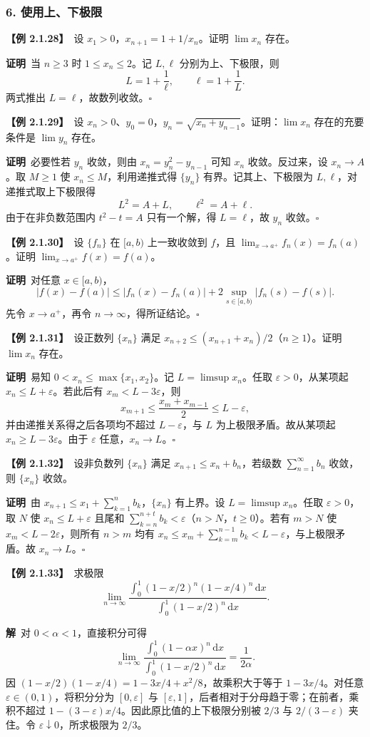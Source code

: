 \documentclass[UTF8,a4paper,11pt]{ctexart}
\newcommand{\ex}[1]{\par\medskip\noindent\textbf{【例 #1】}\ }
\newcommand{\pf}{\par\noindent\textbf{证明}\ }
\newcommand{\sol}{\par\noindent\textbf{解}\ }
\begin{document}
\subsubsection*{6. 使用上、下极限}
\ex{2.1.28}设 $x_1>0$，$x_{n+1}=1+1/x_n$。证明 $\lim x_n$ 存在。
\pf 当 $n\ge3$ 时 $1\le x_n\le2$。记 $L,\ell$ 分别为上、下极限，则
\[
L=1+\frac1\ell,\qquad \ell=1+\frac1L.
\]
两式推出 $L=\ell$，故数列收敛。\hfill$\square$

\ex{2.1.29}设 $x_n>0$、$y_0=0$，$y_n=\sqrt{x_n+y_{n-1}}$。证明：$\lim x_n$ 存在的充要条件是 $\lim y_n$ 存在。
\pf 必要性若 $y_n$ 收敛，则由 $x_n=y_n^2-y_{n-1}$ 可知 $x_n$ 收敛。反过来，设 $x_n\to A$。取 $M\ge1$ 使 $x_n\le M$，利用递推式得 $\{y_n\}$ 有界。记其上、下极限为 $L,\ell$，对递推式取上下极限得
\[
L^2=A+L,\qquad \ell^2=A+\ell.
\]
由于在非负数范围内 $t^2-t=A$ 只有一个解，得 $L=\ell$，故 $y_n$ 收敛。\hfill$\square$

\ex{2.1.30}设 $\{f_n\}$ 在 $[a,b)$ 上一致收敛到 $f$，且 $\lim_{x\to a^+}f_n(x)=f_n(a)$。证明 $\lim_{x\to a^+}f(x)=f(a)$。
\pf 对任意 $x\in[a,b)$，
\[
|f(x)-f(a)|\le |f_n(x)-f_n(a)|+2\sup_{s\in[a,b)}|f_n(s)-f(s)|.
\]
先令 $x\to a^+$，再令 $n\to\infty$，得所证结论。\hfill$\square$

\ex{2.1.31}设正数列 $\{x_n\}$ 满足 $x_{n+2}\le(x_{n+1}+x_n)/2$（$n\ge1$）。证明 $\lim x_n$ 存在。
\pf 易知 $0<x_n\le\max\{x_1,x_2\}$。记 $L=\limsup x_n$。任取 $\varepsilon>0$，从某项起 $x_n\le L+\varepsilon$。若此后有 $x_m<L-3\varepsilon$，则
\[
x_{m+1}\le\frac{x_m+x_{m-1}}2\le L-\varepsilon,
\]
并由递推关系得之后各项均不超过 $L-\varepsilon$，与 $L$ 为上极限矛盾。故从某项起 $x_n\ge L-3\varepsilon$。由于 $\varepsilon$ 任意，$x_n\to L$。\hfill$\square$

\ex{2.1.32}设非负数列 $\{x_n\}$ 满足 $x_{n+1}\le x_n+b_n$，若级数 $\sum_{n=1}^{\infty}b_n$ 收敛，则 $\{x_n\}$ 收敛。
\pf 由 $x_{n+1}\le x_1+\sum_{k=1}^{n}b_k$，$\{x_n\}$ 有上界。设 $L=\limsup x_n$。任取 $\varepsilon>0$，取 $N$ 使 $x_n\le L+\varepsilon$ 且尾和 $\sum_{k=n}^{n+t}b_k<\varepsilon$（$n>N$，$t\ge0$）。若有 $m>N$ 使 $x_m<L-2\varepsilon$，则所有 $n>m$ 均有 $x_n\le x_m+\sum_{k=m}^{n-1}b_k<L-\varepsilon$，与上极限矛盾。故 $x_n\to L$。\hfill$\square$

\ex{2.1.33}求极限
\[
\lim_{n\to\infty}
\frac{\int_0^1(1-x/2)^n(1-x/4)^n\,\mathrm dx}
{\int_0^1(1-x/2)^n\,\mathrm dx}.
\]
\sol 对 $0<\alpha<1$，直接积分可得
\[
\lim_{n\to\infty}
\frac{\int_0^1(1-\alpha x)^n\,\mathrm dx}
{\int_0^1(1-x/2)^n\,\mathrm dx}=\frac1{2\alpha}.
\]
因 $(1-x/2)(1-x/4)=1-3x/4+x^2/8$，故乘积大于等于 $1-3x/4$。对任意 $\varepsilon\in(0,1)$，将积分分为 $[0,\varepsilon]$ 与 $[\varepsilon,1]$，后者相对于分母趋于零；在前者，乘积不超过 $1-(3-\varepsilon)x/4$。因此原比值的上下极限分别被 $2/3$ 与 $2/(3-\varepsilon)$ 夹住。令 $\varepsilon\downarrow0$，所求极限为 $2/3$。
\end{document}

